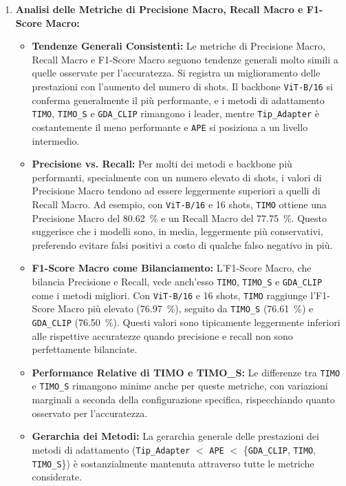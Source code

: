 \documentclass[11pt,a4paper]{article}
\begin{document}
\begin{enumerate}
    \item \textbf{Analisi delle Metriche di Precisione Macro, Recall Macro e F1-Score Macro:}
    \begin{itemize}[label=\textbullet, leftmargin=*]
        \item \textbf{Tendenze Generali Consistenti:} Le metriche di Precisione Macro, Recall Macro e F1-Score Macro seguono tendenze generali molto simili a quelle osservate per l'accuratezza. Si registra un miglioramento delle prestazioni con l'aumento del numero di shots. Il backbone \texttt{ViT-B/16} si conferma generalmente il più performante, e i metodi di adattamento \texttt{TIMO}, \texttt{TIMO\_S} e \texttt{GDA\_CLIP} rimangono i leader, mentre \texttt{Tip\_Adapter} è costantemente il meno performante e \texttt{APE} si posiziona a un livello intermedio.
        \item \textbf{Precisione vs. Recall:} Per molti dei metodi e backbone più performanti, specialmente con un numero elevato di shots, i valori di Precisione Macro tendono ad essere leggermente superiori a quelli di Recall Macro. Ad esempio, con \texttt{ViT-B/16} e 16 shots, \texttt{TIMO} ottiene una Precisione Macro del \SI{80.62}{\percent} e un Recall Macro del \SI{77.75}{\percent}. Questo suggerisce che i modelli sono, in media, leggermente più conservativi, preferendo evitare falsi positivi a costo di qualche falso negativo in più.
        \item \textbf{F1-Score Macro come Bilanciamento:} L'F1-Score Macro, che bilancia Precisione e Recall, vede anch'esso \texttt{TIMO}, \texttt{TIMO\_S} e \texttt{GDA\_CLIP} come i metodi migliori. Con \texttt{ViT-B/16} e 16 shots, \texttt{TIMO} raggiunge l'F1-Score Macro più elevato (\SI{76.97}{\percent}), seguito da \texttt{TIMO\_S} (\SI{76.61}{\percent}) e \texttt{GDA\_CLIP} (\SI{76.50}{\percent}). Questi valori sono tipicamente leggermente inferiori alle rispettive accuratezze quando precisione e recall non sono perfettamente bilanciate.
        \item \textbf{Performance Relative di TIMO e TIMO\_S:} Le differenze tra \texttt{TIMO} e \texttt{TIMO\_S} rimangono minime anche per queste metriche, con variazioni marginali a seconda della configurazione specifica, rispecchiando quanto osservato per l'accuratezza.
        \item \textbf{Gerarchia dei Metodi:} La gerarchia generale delle prestazioni dei metodi di adattamento (\texttt{Tip\_Adapter} $<$ \texttt{APE} $<$ \{\texttt{GDA\_CLIP}, \texttt{TIMO}, \texttt{TIMO\_S}\}) è sostanzialmente mantenuta attraverso tutte le metriche considerate.
    \end{itemize}


\end{enumerate}
\end{document}
